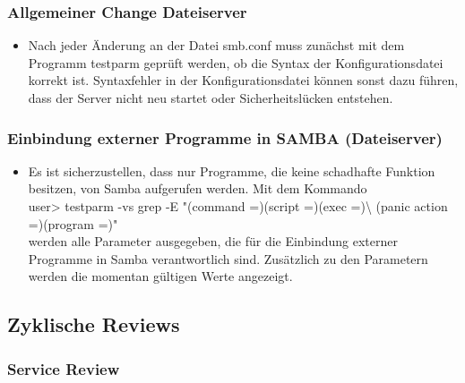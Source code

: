 \documentclass[]{article}
\begin{document}
\subsubsection{Allgemeiner Change
Dateiserver}\label{allgemeiner-change-dateiserver}

\begin{itemize}
\item
  Nach jeder Änderung an der Datei smb.conf muss zunächst mit dem
  Programm testparm geprüft werden, ob die Syntax der
  Konfigurationsdatei korrekt ist. Syntaxfehler in der
  Konfigurationsdatei können sonst dazu führen, dass der Server nicht
  neu startet oder Sicherheitslücken entstehen.
\end{itemize}

\subsubsection{Einbindung externer Programme in SAMBA
(Dateiserver)}\label{einbindung-externer-programme-in-samba-dateiserver}

\begin{itemize}
\item
  Es ist sicherzustellen, dass nur Programme, die keine schadhafte
  Funktion besitzen, von Samba aufgerufen werden. Mit dem Kommando\\
  user\textgreater{} testparm -vs \textbar{} grep -E "(command
  =)\textbar{}(script =)\textbar{}(exec =)\textbar{}\textbackslash{}
  (panic action =)\textbar{}(program =)"\\
  werden alle Parameter ausgegeben, die für die Einbindung externer
  Programme in Samba verantwortlich sind. Zusätzlich zu den Parametern
  werden die momentan gültigen Werte angezeigt.
\end{itemize}

\subsection{Zyklische Reviews}\label{zyklische-reviews}

\subsubsection{Service Review}\label{service-review}
\end{document}

